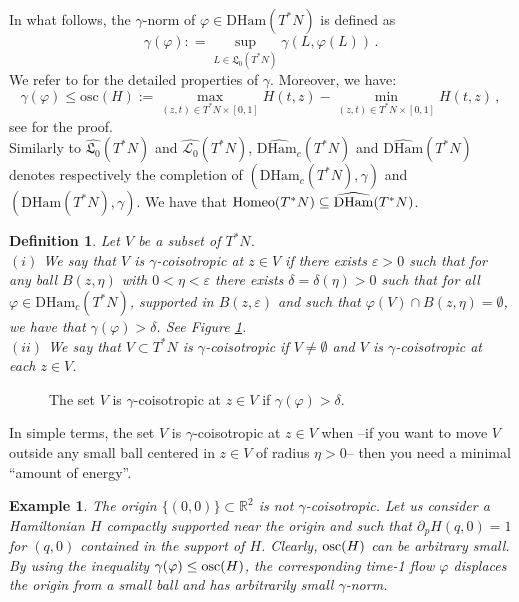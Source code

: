 \documentclass{article}
\newcommand{\1}{\mathbbm{1}}
\newcommand{\numberset}{\mathbb}
\newcommand{\R}{\numberset{R}}
\newtheorem{defn}[thm]{Definition}
\newtheorem{es}{Example}
\theoremstyle{remark}
\begin{document}
{{In what follows, the $\gamma$-norm of $\varphi \in \mathrm{DHam}(T^*N)$ is defined as
\begin{equation}
\gamma(\varphi) : =\sup_{L\in\mathfrak{L}_0(T^*N)} \gamma(L, \varphi(L))\, .
\end{equation}
We refer to \cite[Definition 2.1 and Proposition 2.3]{carVit08} for the detailed properties of $\gamma$. Moreover, we have:
$$\gamma(\varphi) \le \text{osc}(H) := \max_{(z,t) \in T^*N \times [0,1]} H(t,z) - \min_{(z,t) \in T^*N \times [0,1]} H(t,z) \, ,$$
see \cite[Proposition 2.6]{carVit08} for the proof. \\
Similarly to $\widehat{\mathfrak{L}_0}(T^*N)$ and $\widehat{\mathscr{L}_0}(T^*N)$, $\widehat{\mathrm{DHam}_c}(T^*N)$ and $\widehat{\mathrm{DHam}}(T^*N)$ denotes respectively the completion of $(\mathrm{DHam}_c(T^*N),\gamma)$ and $(\mathrm{DHam}(T^*N),\gamma)$. We have that $\textnormal{Homeo}(T^*N) \subseteq \widehat{\mathrm{DHam}}(T^*N)$.
\begin{defn}\label{defn:gamCoi}
    Let $V$ be a subset of $T^*N$. \\
$(i)$ We say that $V$ is $\gamma$-coisotropic at $z\in V$ if there exists $\varepsilon > 0$ such that for any ball $B(z,\eta)$ with $0<\eta<\varepsilon$ there exists $\delta = \delta(\eta)>0$ such that for all $\varphi \in \mathrm{DHam}_c(T^*N)$, supported in $B(z,\varepsilon)$ and such that $\varphi(V) \cap B(z,\eta) = \emptyset$, we have that $\gamma(\varphi)>\delta$. See Figure \ref{fig:gamma coisotropic}. \\
$(ii)$ We say that $V \subset T^*N$ is $\gamma$-coisotropic if $V \ne \emptyset$ and $V$ is $\gamma$-coisotropic at each $z \in V$. 
\end{defn}
\begin{figure}[ht]
  \centering
    
  \caption{The set $V$ is $\gamma$-coisotropic at $z \in V$ if $\gamma(\varphi)>\delta$.}
\label{fig:gamma coisotropic}
\end{figure}
\noindent In simple terms, the set $V$ is $\gamma$-coisotropic at $z \in V$ when --if you want to move $V$ outside any small ball centered in $z \in V$ of radius $\eta > 0$-- then you need a minimal ``amount of energy''.
\begin{es} \textnormal{The origin $\{(0,0)\} \subset\R^2$ is not $\gamma$-coisotropic. Let us consider a Hamiltonian $H$ compactly supported near the origin and such that $\partial_pH(q,0) = 1$ for $(q,0)$ contained in the support of $H$. Clearly, $\textnormal{osc}(H)$ can be arbitrary small. By using the inequality $\gamma(\varphi) \le \textnormal{osc}(H)$, the corresponding time-1 flow $\varphi$ displaces the origin from a small ball and has arbitrarily small $\gamma$-norm.} 

\end{es}}}
\end{document}
